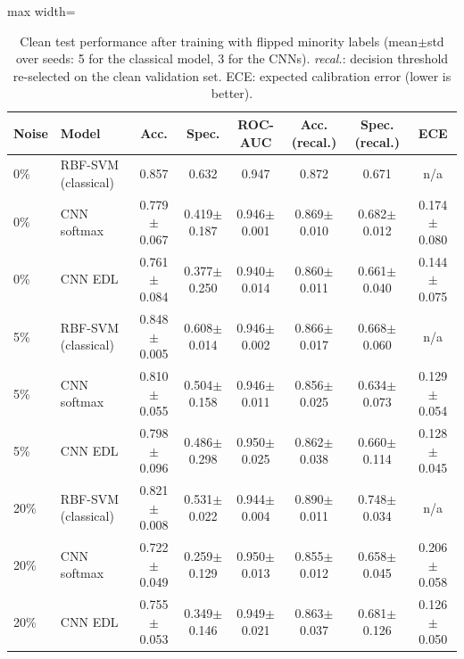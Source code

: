 \begin{table}[t]
\centering
\small
\caption{Clean test performance after training with flipped minority labels (mean$\pm$std over seeds: 5 for the classical model, 3 for the CNNs). \emph{recal.}: decision threshold re-selected on the clean validation set. ECE: expected calibration error (lower is better).}
\label{tab:edl}
\begin{adjustbox}{max width=\textwidth}
\begin{tabular}{llcccccc}
\toprule
Noise & Model & Acc. & Spec. & ROC-AUC & Acc. (recal.) & Spec. (recal.) & ECE \\
\midrule
0\% & RBF-SVM (classical) & 0.857 & 0.632 & 0.947 & 0.872 & 0.671 & n/a \\
0\% & CNN softmax & 0.779$\pm$0.067 & 0.419$\pm$0.187 & 0.946$\pm$0.001 & 0.869$\pm$0.010 & 0.682$\pm$0.012 & 0.174$\pm$0.080 \\
0\% & CNN EDL & 0.761$\pm$0.084 & 0.377$\pm$0.250 & 0.940$\pm$0.014 & 0.860$\pm$0.011 & 0.661$\pm$0.040 & 0.144$\pm$0.075 \\
5\% & RBF-SVM (classical) & 0.848$\pm$0.005 & 0.608$\pm$0.014 & 0.946$\pm$0.002 & 0.866$\pm$0.017 & 0.668$\pm$0.060 & n/a \\
5\% & CNN softmax & 0.810$\pm$0.055 & 0.504$\pm$0.158 & 0.946$\pm$0.011 & 0.856$\pm$0.025 & 0.634$\pm$0.073 & 0.129$\pm$0.054 \\
5\% & CNN EDL & 0.798$\pm$0.096 & 0.486$\pm$0.298 & 0.950$\pm$0.025 & 0.862$\pm$0.038 & 0.660$\pm$0.114 & 0.128$\pm$0.045 \\
20\% & RBF-SVM (classical) & 0.821$\pm$0.008 & 0.531$\pm$0.022 & 0.944$\pm$0.004 & 0.890$\pm$0.011 & 0.748$\pm$0.034 & n/a \\
20\% & CNN softmax & 0.722$\pm$0.049 & 0.259$\pm$0.129 & 0.950$\pm$0.013 & 0.855$\pm$0.012 & 0.658$\pm$0.045 & 0.206$\pm$0.058 \\
20\% & CNN EDL & 0.755$\pm$0.053 & 0.349$\pm$0.146 & 0.949$\pm$0.021 & 0.863$\pm$0.037 & 0.681$\pm$0.126 & 0.126$\pm$0.050 \\
\bottomrule
\end{tabular}
\end{adjustbox}
\end{table}
